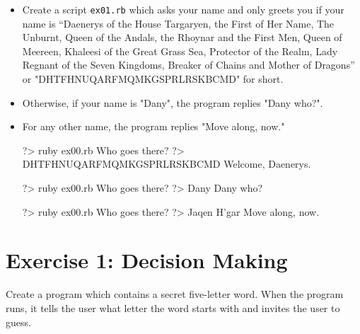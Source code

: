 \documentclass{42-en}
\begin{document}
\begin{itemize}

\item Create a script \texttt{ex01.rb} which asks your name and only greets you if your name is “Daenerys of the House Targaryen, the First of Her Name, The Unburnt, Queen of the Andals, the Rhoynar and the First Men, Queen of Meereen, Khaleesi of the Great Grass Sea, Protector of the Realm, Lady Regnant of the Seven Kingdoms, Breaker of Chains and Mother of Dragons” or "DHTFHNUQARFMQMKGSPRLRSKBCMD" for short. 
\item Otherwise, if your name is "Dany", the program replies "Dany who?". 
\item For any other name, the program replies "Move along, now."

\begin{42console}
	?> ruby ex00.rb
	Who goes there?
	?> DHTFHNUQARFMQMKGSPRLRSKBCMD
	Welcome, Daenerys.
\end{42console}

\begin{42console}
	?> ruby ex00.rb
	Who goes there?
	?> Dany
	Dany who?
\end{42console}

\begin{42console}
	?> ruby ex00.rb
	Who goes there?
	?> Jaqen H'gar
	Move along, now.
\end{42console}

\end{itemize}



\chapter{Exercise 1: Decision Making}

\makeheaderfiles

Create a program which contains a secret five-letter word.
When the program runs, it tells the user what letter the word starts with and invites the user to guess.\\
\end{document}
